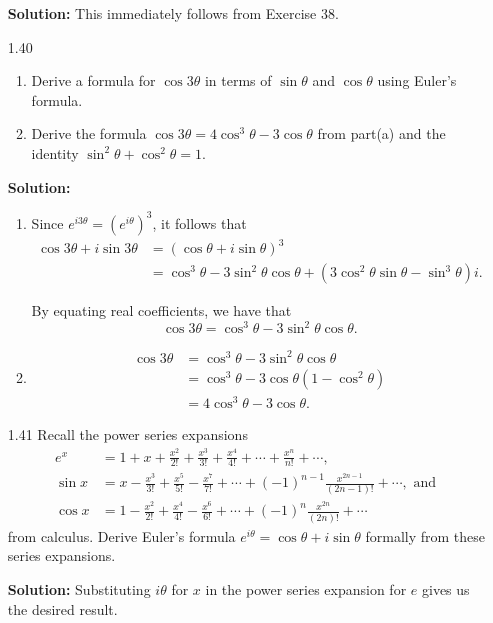\begin{enumerate}
      \textbf{Solution:} This immediately follows from Exercise 38.
   \item[1.40]
      \begin{enumerate}
         \item Derive a formula for $\cos 3\theta$ in terms of $\sin\theta$ and
               $\cos\theta$ using Euler's formula.
         \item Derive the formula
               $\cos 3\theta = 4 \cos^3\theta - 3\cos\theta$ from part(a) and
               the identity $\sin^2\theta + \cos^2\theta = 1$.
      \end{enumerate}

      \textbf{Solution:}

      \begin{enumerate}
         \item Since $e^{i3\theta} = (e^{i\theta})^3$, it follows that
               \begin{align*}
                  \cos 3\theta + i\sin 3\theta &= (\cos\theta + i\sin\theta)^3\\
                     &= \cos^3\theta - 3\sin^2\theta\cos\theta +
                        (3\cos^2\theta\sin\theta - \sin^3\theta)i.
               \end{align*}

               By equating real coefficients, we have that 
               $$\cos 3\theta = \cos^3\theta - 3\sin^2\theta\cos\theta.$$

         \item \begin{align*}
                  \cos 3\theta &= \cos^3\theta - 3\sin^2\theta\cos\theta \\
                     &= \cos^3\theta - 3\cos\theta(1 - \cos^2\theta) \\
                     &= 4 \cos^3\theta - 3\cos\theta.
               \end{align*}
      \end{enumerate}
   \item[1.41] Recall the power series expansions
               \begin{align*}
                  e^x &= 1 + x + \frac{x^2}{2!} + \frac{x^3}{3!} +
                        \frac{x^4}{4!} + \cdots + \frac{x^n}{n!} + \cdots, \\
                  \sin x &= x - \frac{x^3}{3!} + \frac{x^5}{5!} - \frac{x^7}{7!}
                            + \cdots + (-1)^{n - 1}\frac{x^{2n - 1}}{(2n - 1)!} 
                            + \cdots, \mbox{ and } \\
                  \cos x &= 1 - \frac{x^2}{2!} + \frac{x^4}{4!} - \frac{x^6}{6!}
                            + \cdots + (-1)^n\frac{x^{2n}}{(2n)!} + \cdots      
               \end{align*}
               from calculus. Derive Euler's formula
               $e^{i\theta} = \cos\theta + i \sin\theta$ formally from these
               series expansions.

      \textbf{Solution:} Substituting $i\theta$ for $x$ in the power series 
      expansion for $e$ gives us the desired result.
            
\end{enumerate}
